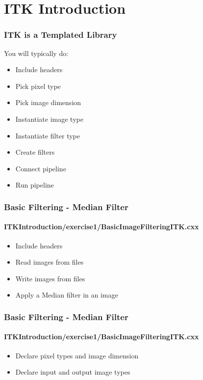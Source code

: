 \section{ITK Introduction}



\begin{frame}
\frametitle{ITK is a Templated Library}
You will typically do:
\begin{itemize}
\item Include headers
\pause
\item Pick pixel type
\pause
\item Pick image dimension
\pause
\item Instantiate image type
\pause
\item Instantiate filter type
\pause
\item Create filters
\pause
\item Connect pipeline
\pause
\item Run pipeline
\end{itemize}
\end{frame}

{
\begin{frame}[fragile]
\frametitle{Basic Filtering - Median Filter}
\framesubtitle{ITKIntroduction/exercise1/BasicImageFilteringITK.cxx}
\begin{itemize}
\item Include headers
\end{itemize}
\pause
\begin{itemize}
\item Read images from files
\item Write images from files
\item Apply a Median filter in an image
\end{itemize}
\end{frame}
}

{
\begin{frame}[fragile]
\frametitle{Basic Filtering - Median Filter}
\framesubtitle{ITKIntroduction/exercise1/BasicImageFilteringITK.cxx}
\begin{itemize}
\item Declare pixel types and image dimension
\end{itemize}
\pause
\begin{itemize}
\item Declare input and output image types
\end{itemize}
\end{frame}
}


